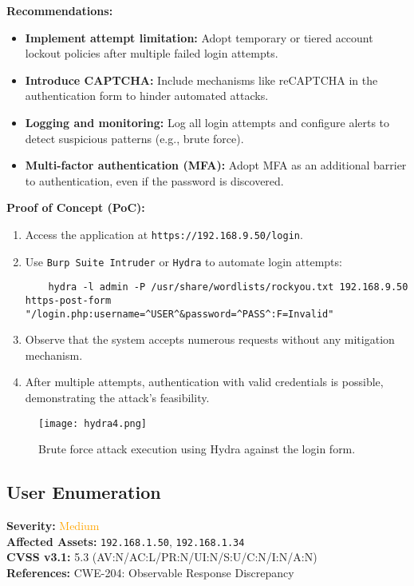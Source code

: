 \documentclass[a4paper,12pt]{article}
\begin{document}
\textbf{Recommendations:}  
\begin{itemize}
    \item \textbf{Implement attempt limitation:} Adopt temporary or tiered account lockout policies after multiple failed login attempts.  
    \item \textbf{Introduce CAPTCHA:} Include mechanisms like reCAPTCHA in the authentication form to hinder automated attacks.  
    \item \textbf{Logging and monitoring:} Log all login attempts and configure alerts to detect suspicious patterns (e.g., brute force).  
    \item \textbf{Multi-factor authentication (MFA):} Adopt MFA as an additional barrier to authentication, even if the password is discovered.  
\end{itemize}

\textbf{Proof of Concept (PoC):}  
\begin{enumerate}
    \item Access the application at \texttt{https://192.168.9.50/login}.  
    \item Use \texttt{Burp Suite Intruder} or \texttt{Hydra} to automate login attempts:
    \begin{verbatim}
    hydra -l admin -P /usr/share/wordlists/rockyou.txt 192.168.9.50 https-post-form "/login.php:username=^USER^&password=^PASS^:F=Invalid"
    \end{verbatim}
    \item Observe that the system accepts numerous requests without any mitigation mechanism.  
    \item After multiple attempts, authentication with valid credentials is possible, demonstrating the attack's feasibility.  
\end{enumerate}

\begin{figure}[H]
    \centering
    \texttt{[image: hydra4.png]}
    \caption{Brute force attack execution using Hydra against the login form.}
\end{figure}

\clearpage

\subsection{User Enumeration}
\textbf{Severity:} \textcolor{Orange}{Medium} \\
\textbf{Affected Assets:} \texttt{192.168.1.50}, \texttt{192.168.1.34} \\
\textbf{CVSS v3.1:} 5.3 (AV:N/AC:L/PR:N/UI:N/S:U/C:N/I:N/A:N) \\
\textbf{References:} CWE-204: Observable Response Discrepancy
\end{document}
